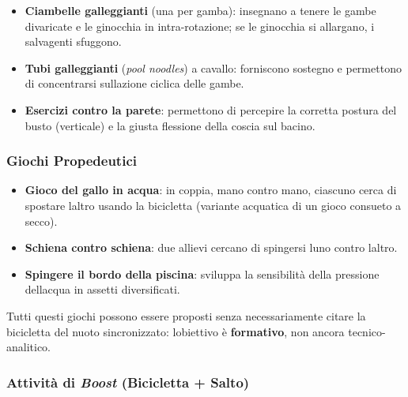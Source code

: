 \documentclass[a4paper,11pt]{article}
\providecommand{\tightlist}{%
  \setlength{\itemsep}{0pt}\setlength{\parskip}{0pt}}
\begin{document}
\begin{itemize}
      \tightlist
      \item
            \textbf{Ciambelle galleggianti} (una per gamba): insegnano a tenere le
            gambe divaricate e le ginocchia in intra-rotazione; se le ginocchia si
            allargano, i salvagenti sfuggono.
      \item
            \textbf{Tubi galleggianti} (\emph{pool noodles}) a cavallo: forniscono
            sostegno e permettono di concentrarsi sull\textquotesingle azione
            ciclica delle gambe.
      \item
            \textbf{Esercizi contro la parete}: permettono di percepire la
            corretta postura del busto (verticale) e la giusta flessione della
            coscia sul bacino.
\end{itemize}

\subsubsection{Giochi Propedeutici}\label{giochi-propedeutici}

\begin{itemize}
      \tightlist
      \item
            \textbf{Gioco del gallo in acqua}: in coppia, mano contro mano,
            ciascuno cerca di spostare l\textquotesingle altro usando la
            bicicletta (variante acquatica di un gioco consueto a secco).
      \item
            \textbf{Schiena contro schiena}: due allievi cercano di spingersi
            l\textquotesingle uno contro l\textquotesingle altro.
      \item
            \textbf{Spingere il bordo della piscina}: sviluppa la sensibilità
            della pressione dell\textquotesingle acqua in assetti diversificati.
\end{itemize}

Tutti questi giochi possono essere proposti senza necessariamente citare
la bicicletta del nuoto sincronizzato: l\textquotesingle obiettivo è
\textbf{formativo}, non ancora tecnico-analitico.

\subsubsection{\texorpdfstring{Attività di \emph{Boost} (Bicicletta +
            Salto)}{Attività di Boost (Bicicletta + Salto)}}\label{attivituxe0-di-boost-bicicletta-salto}
\end{document}
